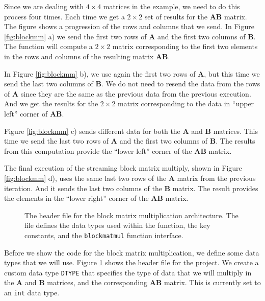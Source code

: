 Since we are dealing with $4 \times 4$ matrices in the example, we need to do this process four times. Each time we get a $2 \times 2$ set of results for the $\mathbf{AB}$ matrix. The figure shows a progression of the rows and columns that we send. In Figure \ref{fig:blockmm} a) we send the first two rows of $\mathbf{A}$ and the first two columns of $\mathbf{B}$. The function will compute a $2 \times 2$ matrix corresponding to the first two elements in the rows and columns of the resulting matrix $\mathbf{AB}$. 

In Figure \ref{fig:blockmm} b), we use again the first two rows of $\mathbf{A}$, but this time we send the last two columns of $\mathbf{B}$. We do not need to resend the data from the rows of $\mathbf{A}$ since they are the same as the previous data from the previous execution. And we get the results for the $2 \times 2$ matrix corresponding to the data in ``upper left'' corner of $\mathbf{AB}$. 

Figure \ref{fig:blockmm} c) sends different data for both the $\mathbf{A}$ and $\mathbf{B}$ matrices. This time we send the last two rows of $\mathbf{A}$ and the first two columns of $\mathbf{B}$. The results from this computation provide the ``lower left'' corner of the $\mathbf{AB}$ matrix.

The final execution of the streaming block matrix multiply, shown in Figure \ref{fig:blockmm} d), uses the same last two rows of the $\mathbf{A}$ matrix from the previous iteration. And it sends the last two columns of the $\mathbf{B}$ matrix. The result provides the elements in the ``lower right'' corner of the $\mathbf{AB}$ matrix. 

\begin{figure}

\caption{  The header file for the block matrix multiplication architecture. The file defines the data types used within the function, the key constants, and the \lstinline{blockmatmul} function interface.   }
\label{fig:block_mm_h}
\end{figure}

Before we show the code for the block matrix multiplication, we define some data types that we will use. Figure \ref{fig:block_mm_h} shows the header file for the project. We create a custom data type \lstinline{DTYPE} that specifies the type of data that we will multiply in the $\mathbf{A}$ and $\mathbf{B}$ matrices, and the corresponding $\mathbf{AB}$ matrix. This is currently set to an \lstinline{int} data type.

